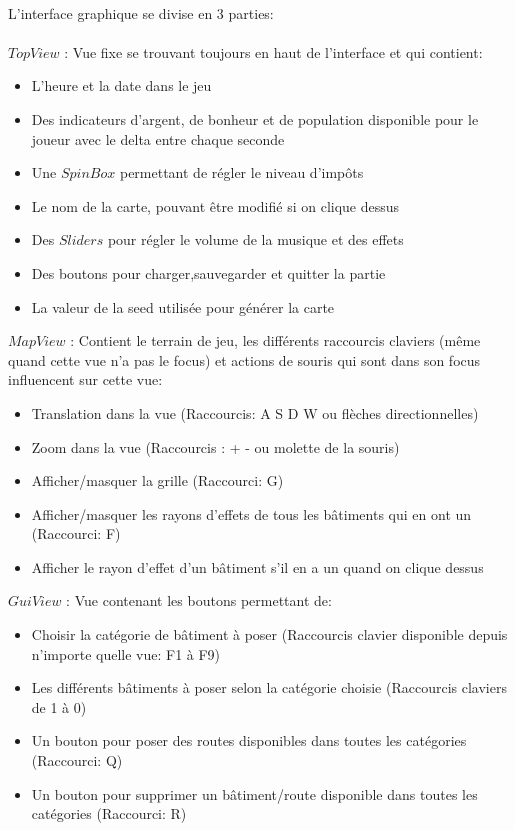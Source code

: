 \documentclass[a4paper,10pt,openany,oneside]{report}
\begin{document}
\paragraph{}
L'interface graphique se divise en 3 parties:\\\\
$TopView$ : Vue fixe se trouvant toujours en haut de l'interface et qui contient:
\begin{itemize}
\item L'heure et la date dans le jeu
\item Des indicateurs d'argent, de bonheur et de population disponible pour le joueur avec le delta entre chaque seconde
\item Une $SpinBox$ permettant de régler le niveau d'impôts
\item Le nom de la carte, pouvant être modifié si on clique dessus
\item Des $Sliders$ pour régler le volume de la musique et des effets
\item Des boutons pour charger,sauvegarder et quitter la partie
\item La valeur de la seed utilisée pour générer la carte
\end{itemize}
$MapView$ : Contient le terrain de jeu, les différents raccourcis claviers (même quand cette vue n'a pas le focus) et actions de souris qui sont dans son focus influencent sur cette vue:
\begin{itemize}
\item Translation dans la vue (Raccourcis: A S D W ou flèches directionnelles)
\item Zoom dans la vue (Raccourcis : + - ou molette de la souris)
\item Afficher/masquer la grille (Raccourci: G)
\item Afficher/masquer les rayons d'effets de tous les bâtiments qui en ont un (Raccourci: F)
\item Afficher le rayon d'effet d'un bâtiment s'il en a un quand on clique dessus
\end{itemize}
$GuiView$ : Vue contenant les boutons permettant de:
\begin{itemize}
\item Choisir la catégorie de bâtiment à poser (Raccourcis clavier disponible depuis n'importe quelle vue: F1 à F9)
\item Les différents bâtiments à poser selon la catégorie choisie (Raccourcis claviers de 1 à 0)
\item Un bouton pour poser des routes disponibles dans toutes les catégories (Raccourci: Q)
\item Un bouton pour supprimer un bâtiment/route disponible dans toutes les catégories (Raccourci: R)
\end{itemize}
\end{document}
